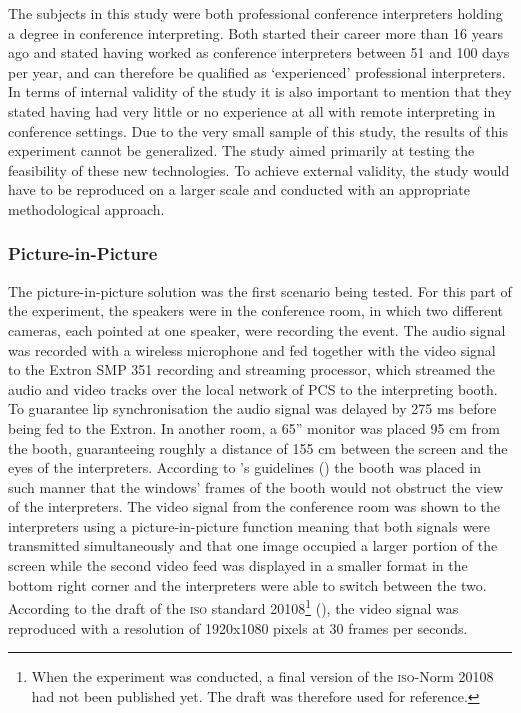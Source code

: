 \documentclass[output=paper]{langsci/langscibook}
\begin{document}
The subjects in this study were both professional conference interpreters holding a degree in conference interpreting. Both started their career more than 16 years ago and stated having worked as conference interpreters between 51 and 100 days per year, and can therefore be qualified as ‘experienced’ professional interpreters. In terms of internal validity of the study it is also important to mention that they stated having had very little or no experience at all with remote interpreting in conference settings. Due to the very small sample of this study, the results of this experiment cannot be generalized. The study aimed primarily at testing the feasibility of these new technologies. To achieve external validity, the study would have to be reproduced on a larger scale and conducted with an appropriate methodological approach.

\subsubsection{Picture-in-Picture} 

The picture-in-picture solution was the first scenario being tested. For this part of the experiment, the speakers were in the conference room, in which two different cameras, each pointed at one speaker, were recording the event. The audio signal was recorded with a wireless microphone and fed together with the video signal to the Extron SMP 351 recording and streaming processor, which streamed the audio and video tracks over the local network of PCS to the interpreting booth. To guarantee lip synchronisation the audio signal was delayed by 275 ms before being fed to the Extron. In another room, a 65” monitor was placed 95 cm from the booth, guaranteeing roughly a distance of 155 cm between the screen and the eyes of the interpreters. According to \citeauthor{Causo2011}’s guidelines (\citeyear[2]{Causo2011}) the booth was placed in such manner that the windows’ frames of the booth would not obstruct the view of the interpreters. The video signal from the conference room was shown to the interpreters using a picture-in-picture function meaning that both signals were transmitted simultaneously and that one image occupied a larger portion of the screen while the second video feed was displayed in a smaller format in the bottom right corner and the interpreters were able to switch between the two. According to the draft of the \textsc{iso} standard 20108\footnote{When the experiment was conducted, a final version of the \textsc{iso}-Norm 20108 had not been published yet. The draft was therefore used for reference.} (\citeyear[6]{ISO20108}), the video signal was reproduced with a resolution of 1920x1080 pixels at 30 frames per seconds. 
\end{document}
